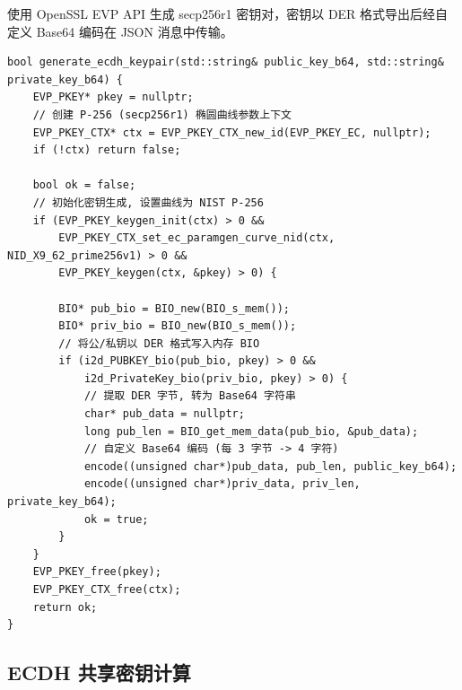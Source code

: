 \documentclass[12pt]{article}
\begin{document}
使用 OpenSSL EVP API 生成 secp256r1 密钥对，密钥以 DER 格式导出后经自定义 Base64 编码在 JSON 消息中传输。

\begin{lstlisting}[caption={ECDH 密钥对生成 (utils.cpp)},label={lst:ecdh-gen}]
bool generate_ecdh_keypair(std::string& public_key_b64, std::string& private_key_b64) {
    EVP_PKEY* pkey = nullptr;
    // 创建 P-256 (secp256r1) 椭圆曲线参数上下文
    EVP_PKEY_CTX* ctx = EVP_PKEY_CTX_new_id(EVP_PKEY_EC, nullptr);
    if (!ctx) return false;

    bool ok = false;
    // 初始化密钥生成, 设置曲线为 NIST P-256
    if (EVP_PKEY_keygen_init(ctx) > 0 &&
        EVP_PKEY_CTX_set_ec_paramgen_curve_nid(ctx, NID_X9_62_prime256v1) > 0 &&
        EVP_PKEY_keygen(ctx, &pkey) > 0) {

        BIO* pub_bio = BIO_new(BIO_s_mem());
        BIO* priv_bio = BIO_new(BIO_s_mem());
        // 将公/私钥以 DER 格式写入内存 BIO
        if (i2d_PUBKEY_bio(pub_bio, pkey) > 0 &&
            i2d_PrivateKey_bio(priv_bio, pkey) > 0) {
            // 提取 DER 字节, 转为 Base64 字符串
            char* pub_data = nullptr;
            long pub_len = BIO_get_mem_data(pub_bio, &pub_data);
            // 自定义 Base64 编码 (每 3 字节 -> 4 字符)
            encode((unsigned char*)pub_data, pub_len, public_key_b64);
            encode((unsigned char*)priv_data, priv_len, private_key_b64);
            ok = true;
        }
    }
    EVP_PKEY_free(pkey);
    EVP_PKEY_CTX_free(ctx);
    return ok;
}
\end{lstlisting}

\subsection{ECDH 共享密钥计算}
\end{document}
